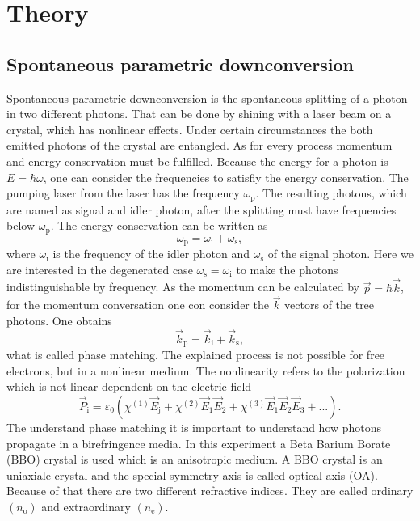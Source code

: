 \section{Theory}
\subsection{Spontaneous parametric downconversion} 
Spontaneous parametric downconversion is the spontaneous splitting of a photon in two different photons. That can be done by shining with a laser beam on a crystal, which has nonlinear effects. Under certain circumstances the both emitted photons of the crystal are entangled. 
As for every process momentum and energy conservation must be fulfilled. Because the energy for a photon is $E = \hbar \omega$, one can consider the frequencies to satisfiy the energy conservation. The pumping laser from the laser has the frequency $\omega_{\mathrm{p}}$. The resulting photons, which are named as signal and idler photon, after the splitting must have frequencies below $\omega_{\mathrm{p}}$. The energy conservation can be written as
\begin{equation}
    \omega_{\mathrm{p}} = \omega_{\mathrm{i}} + \omega_{\mathrm{s}},
\end{equation}
where $\omega_{\mathrm{i}}$ is the frequency of the idler photon and $\omega_{\mathrm{s}}$ of the signal photon. Here we are interested in the degenerated case $ \omega_{\mathrm{s}} = \omega_{\mathrm{i}}$ to make the photons indistinguishable by frequency. 
As the momentum can be calculated by $\vec{p} = \hbar \vec{k}$, for  the momentum conversation one con consider the $\vec{k}$ vectors of the tree photons. One obtains
\begin{equation}
    \vec{k}_{\mathrm{p}} =  \vec{k}_{\mathrm{i}}  + \vec{k}_{\mathrm{s}},
    \label{eq:phase_matching}
\end{equation}
what is called phase matching. 
The explained process is not possible for free electrons, but in a nonlinear medium. The nonlinearity refers to the polarization which is not linear dependent on the electric field
\begin{equation}
    \vec{P}_{\mathrm{i}} = \varepsilon_0 \left( \chi^{(1)} \vec{E}_{\mathrm{j}} 
    + \chi^{(2)} \vec{E}_1 \vec{E}_2 
    + \chi^{(3)} \vec{E}_1 \vec{E}_2 \vec{E}_3 + ... \right).
\end{equation}
The understand phase matching it is important to understand how photons propagate in a birefringence media. In this experiment a Beta Barium Borate (BBO) crystal is used which is an anisotropic medium. A BBO crystal is an uniaxiale crystal and the special symmetry axis is called optical axis (OA).  Because of that there are two different refractive indices. They are called ordinary $(n_{\mathrm{o}})$ and extraordinary $(n_{\mathrm{e}})$. 
